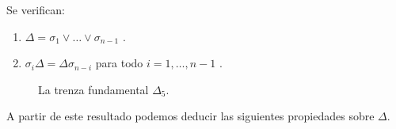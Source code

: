 \documentclass[bibtex, anon]{TEMat-article}
\begin{document}
\begin{proposicion}\label{conjuga}
	Se verifican: 
	\begin{enumerate}
		\item $\Delta=\sigma_1\lor\dots\lor\sigma_{n-1}$ \cite[Lema 1]{Garside}.
		\item $\sigma_i\Delta=\Delta\sigma_{n-i}$ para todo $i=1,\dots, n-1$ \cite[Lema 4]{Garside}.
	\end{enumerate}
\end{proposicion} 


\begin{figure}[h!]
	\centering
	\caption{La trenza fundamental $\Delta_5$.}
\end{figure}


A partir de este resultado podemos deducir las siguientes propiedades sobre $\Delta$.
\end{document}
